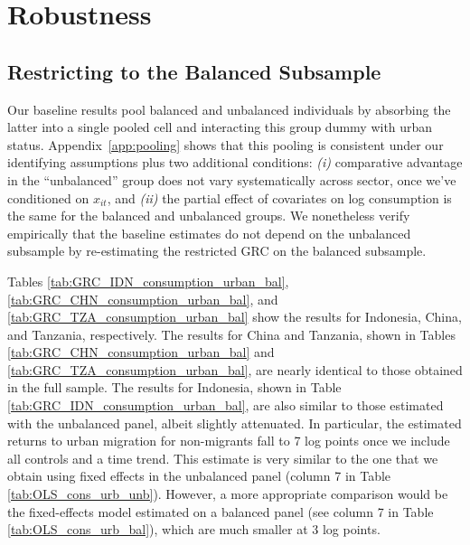 \documentclass[12pt]{article}
\begin{document}
\FloatBarrier

\section{Robustness}\label{sec:robustness}

\subsection{Restricting to the Balanced Subsample}\label{subsec:balanced}

Our baseline results pool balanced and unbalanced individuals by absorbing the latter into a single pooled cell and interacting this group dummy with urban status.
Appendix~\ref{app:pooling} shows that this pooling is consistent under our identifying assumptions plus two additional conditions: \textit{(i)} comparative advantage in the ``unbalanced'' group does not vary systematically across sector, once we've conditioned on $x_{i t}$, and \textit{(ii)} the partial effect of covariates on log consumption is the same for the balanced and unbalanced groups.
We nonetheless verify empirically that the baseline estimates do not depend on the unbalanced subsample by re-estimating the restricted GRC on the balanced subsample.

Tables \ref{tab:GRC_IDN_consumption_urban_bal}, \ref{tab:GRC_CHN_consumption_urban_bal}, and \ref{tab:GRC_TZA_consumption_urban_bal}  show the results for Indonesia, China, and Tanzania, respectively.
The results for China and Tanzania, shown in Tables \ref{tab:GRC_CHN_consumption_urban_bal} and \ref{tab:GRC_TZA_consumption_urban_bal}, are nearly identical to those obtained in the full sample.
The results for Indonesia, shown in Table \ref{tab:GRC_IDN_consumption_urban_bal}, are also similar to those estimated with the unbalanced panel, albeit slightly attenuated. 
In particular, the estimated returns to urban migration for non-migrants fall to 7 log points once we include all controls and a time trend. 
This estimate is very similar to the one that we obtain using fixed effects in the unbalanced panel (column 7 in Table \ref{tab:OLS_cons_urb_unb}). 
However, a more appropriate comparison would be the fixed-effects model estimated on a balanced panel (see column 7 in Table \ref{tab:OLS_cons_urb_bal}), which are much smaller at 3 log points. 
\end{document}
